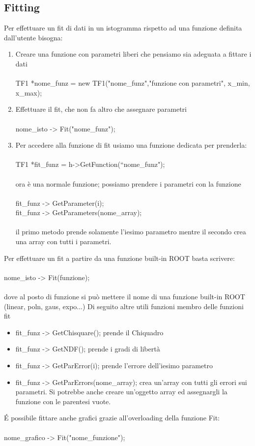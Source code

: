 \documentclass[10pt,a4paper]{article}
\begin{document}
\subsection{Fitting}
Per effettuare un fit di dati in un istogramma rispetto ad una funzione definita dall'utente bisogna:
\begin{enumerate}
	\item Creare una funzione con parametri liberi che pensiamo sia adeguata a fittare i dati\\\\
	TF1 *nome\_funz = new TF1("nome\_funz","funzione con parametri", x\_min, x\_max);\\
	\item Effettuare il fit, che non fa altro che assegnare parametri\\\\
	nome\_isto -> Fit("nome\_funz");\\
	\item Per accedere alla funzione di fit usiamo una funzione dedicata per prenderla:\\\\
	 TF1 *fit\_funz = h->GetFunction(“nome\_funz");\\\\
	 ora è una normale funzione; possiamo prendere i parametri con la funzione\\\\
	 fit\_funz -> GetParameter(i);\\
	 fit\_funz -> GetParameters(nome\_array);\\\\
	 il primo metodo prende solamente l'iesimo parametro mentre il secondo crea una array con tutti i parametri.\\
\end{enumerate}
Per effettuare un fit a partire da una funzione built-in ROOT basta scrivere:\\\\
nome\_isto -> Fit(funzione);\\\\
dove al posto di funzione si può mettere il nome di una funzione built-in ROOT (linear, poln, gaus, expo...)
Di seguito altre utili funzioni membro delle funzioni fit
\begin{itemize}
	\item fit\_funz -> GetChisquare(); 
	prende il Chiquadro
	\item fit\_funz -> GetNDF();
	prende i gradi di libertà
	\item fit\_funz -> GetParError(i);
	prende l'errore dell'iesimo parametro
	\item fit\_funz -> GetParErrors(nome\_array);
	crea un'array con tutti gli errori sui parametri. Si potrebbe anche creare un'oggetto array ed assegnargli la funzione con le parentesi vuote.
\end{itemize}
\'{E} possibile fittare anche grafici grazie all'overloading della funzione Fit:\\\\
nome\_grafico -> Fit("nome\_funzione");\\
\end{document}
